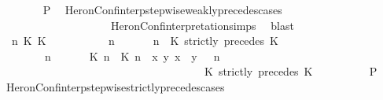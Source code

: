 \begin{isabellebody}
\ \ \ \ \ \ \isamarkupfalse%
\ {\isacharquery}P\ \isamarkupfalse%
\ HeronConf{\isacharunderscore}interp{\isacharunderscore}stepwise{\isacharunderscore}weakly{\isacharunderscore}precedes{\isacharunderscore}cases\isanewline
\ \ \ \ \ \ \ \ \ \ \ \ \ \ \ \ \ \ \ \ HeronConf{\isacharunderscore}interpretation{\isachardot}simps\ \isamarkupfalse%
\ blast\isanewline
\ \ \ \ \isamarkupfalse%
\isanewline
\ \ \ \ \ \ \isamarkupfalse%
\ {\isasymGamma}\ n\ K\ K\ {\isasymPsi}\ {\isasymPhi}\isanewline
\ \ \ \ \ \ \isamarkupfalse%
\ {\isacartoucheopen}{\isacharparenleft}{\isasymGamma}\ n\ {\isasymturnstile}\ {\isasymPsi}\ {\isasymtriangleright}\ {\isasymPhi}\ {\isacharequal}\ {\isacharparenleft}{\isasymGamma}{\isacharcomma}\ n\ {\isasymturnstile}\ {\isacharparenleft}{\isacharparenleft}K\ strictly\ precedes\ K\ {\isacharhash}\ {\isasymPsi}{\isacharparenright}\ {\isasymtriangleright}\ {\isasymPhi}{\isacharparenright}{\isacartoucheclose}\isanewline
\ \ \ \ \ \ \ {\isacartoucheopen}{\isacharparenleft}{\isasymGamma}\ n\ {\isasymturnstile}\ {\isasymPsi}\ {\isasymtriangleright}\ {\isasymPhi}\ {\isacharequal}\ {\isacharparenleft}{\isacharparenleft}{\isacharparenleft}{\isasymlceil}{\isacharhash}\isactrlsup {\isasymle}\ K\ n{\isacharcomma}\ {\isacharhash}\isactrlsup {\isacharless}\ K\ n{\isasymrceil}\ {\isasymin}\ {\isacharparenleft}{\isasymlambda}{\isacharparenleft}x{\isacharcomma}\ y{\isacharparenright}{\isachardot}\ x\ {\isasymle}\ y{\isacharparenright}{\isacharparenright}\ {\isacharhash}\ {\isasymGamma}{\isacharparenright}{\isacharcomma}\ n\isanewline
\ \ \ \ \ \ \ \ \ \ \ \ \ \ \ \ \ \ \ \ \ \ \ \ \ \ \ \ \ \ \ \ \ \ {\isasymturnstile}\ {\isasymPsi}\ {\isasymtriangleright}\ {\isacharparenleft}{\isacharparenleft}K\ strictly\ precedes\ K\ {\isacharhash}\ {\isasymPhi}{\isacharparenright}{\isacharparenright}{\isacartoucheclose}\isanewline
\ \ \ \ \ \ \isamarkupfalse%
\ {\isacharquery}P\ \isamarkupfalse%
\ HeronConf{\isacharunderscore}interp{\isacharunderscore}stepwise{\isacharunderscore}strictly{\isacharunderscore}precedes{\isacharunderscore}cases\isanewline

\end{isabellebody}
